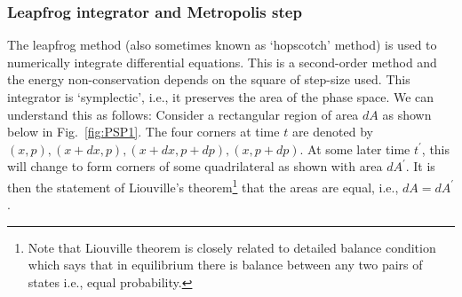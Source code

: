 \documentclass[11pt]{article}
\begin{document}
\subsubsection{Leapfrog integrator and Metropolis step}
The leapfrog method (also sometimes known as `hopscotch' method) 
is used to numerically integrate differential equations. This is a second-order 
method and the energy non-conservation depends on the square of step-size used. This integrator is `symplectic', i.e., it preserves the 
area of the phase space. We can understand this as follows: 
Consider a rectangular region of area $dA$ as shown below in Fig.~\ref{fig:PSP1}. The four corners at time $t$ are denoted by $(x, p), (x+dx, p), (x+dx, p+dp),(x, p+dp)$. At some later time $t^{\prime}$, this will change to form corners of some quadrilateral as shown with area $dA^{\prime}$. It is then the statement of Liouville's theorem\footnote{Note that Liouville theorem is closely related to detailed balance condition which says that in equilibrium there is balance between any two pairs of states i.e., equal probability.} that the areas are equal, i.e., $dA = dA^{\prime}$. 
\end{document}
